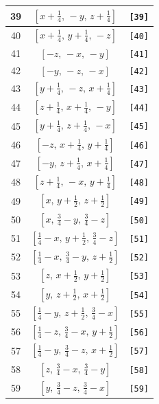 \documentclass[fleqn,8pt]{jsarticle}
\begin{document}
\begin{longtable}{ccc}
39 & $\left[ x + \frac{1}{4},\, - y,\, z + \frac{1}{4} \right]$ & {\tt [39]} \\ \hline
40 & $\left[ x + \frac{1}{4},\, y + \frac{1}{4},\, - z \right]$ & {\tt [40]} \\ \hline
41 & $\left[ - z,\, - x,\, - y \right]$ & {\tt [41]} \\ \hline
42 & $\left[ - y,\, - z,\, - x \right]$ & {\tt [42]} \\ \hline
43 & $\left[ y + \frac{1}{4},\, - z,\, x + \frac{1}{4} \right]$ & {\tt [43]} \\ \hline
44 & $\left[ z + \frac{1}{4},\, x + \frac{1}{4},\, - y \right]$ & {\tt [44]} \\ \hline
45 & $\left[ y + \frac{1}{4},\, z + \frac{1}{4},\, - x \right]$ & {\tt [45]} \\ \hline
46 & $\left[ - z,\, x + \frac{1}{4},\, y + \frac{1}{4} \right]$ & {\tt [46]} \\ \hline
47 & $\left[ - y,\, z + \frac{1}{4},\, x + \frac{1}{4} \right]$ & {\tt [47]} \\ \hline
48 & $\left[ z + \frac{1}{4},\, - x,\, y + \frac{1}{4} \right]$ & {\tt [48]} \\ \hline
49 & $\left[ x,\, y + \frac{1}{2},\, z + \frac{1}{2} \right]$ & {\tt [49]} \\ \hline
50 & $\left[ x,\, \frac{3}{4} - y,\, \frac{3}{4} - z \right]$ & {\tt [50]} \\ \hline
51 & $\left[ \frac{1}{4} - x,\, y + \frac{1}{2},\, \frac{3}{4} - z \right]$ & {\tt [51]} \\ \hline
52 & $\left[ \frac{1}{4} - x,\, \frac{3}{4} - y,\, z + \frac{1}{2} \right]$ & {\tt [52]} \\ \hline
53 & $\left[ z,\, x + \frac{1}{2},\, y + \frac{1}{2} \right]$ & {\tt [53]} \\ \hline
54 & $\left[ y,\, z + \frac{1}{2},\, x + \frac{1}{2} \right]$ & {\tt [54]} \\ \hline
55 & $\left[ \frac{1}{4} - y,\, z + \frac{1}{2},\, \frac{3}{4} - x \right]$ & {\tt [55]} \\ \hline
56 & $\left[ \frac{1}{4} - z,\, \frac{3}{4} - x,\, y + \frac{1}{2} \right]$ & {\tt [56]} \\ \hline
57 & $\left[ \frac{1}{4} - y,\, \frac{3}{4} - z,\, x + \frac{1}{2} \right]$ & {\tt [57]} \\ \hline
58 & $\left[ z,\, \frac{3}{4} - x,\, \frac{3}{4} - y \right]$ & {\tt [58]} \\ \hline
59 & $\left[ y,\, \frac{3}{4} - z,\, \frac{3}{4} - x \right]$ & {\tt [59]} \\ \hline

\end{longtable}
\end{document}
